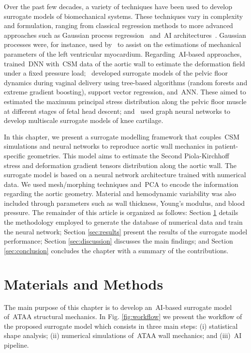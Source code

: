 \documentclass[a4paper,fleqn]{cas-sc}
\begin{document}
Over the past few decades, a variety of techniques have been used to develop surrogate models of biomechanical systems. These techniques vary in complexity and formulation, ranging from classical regression methods to more advanced approaches such as Gaussian process regression~\cite{Su2017_ji,Saida2023_vm} and~\gls{AI} architectures~\cite{Hashemi2023,Moura2024_vy}. Gaussian processes were, for instance, used by~\citet{Di_Achille2018_pn} to assist on the estimations of mechanical parameters of the left ventricular myocardium. Regarding~\gls{AI}-based approaches,~\citet{Liang2023_on} trained~\gls{DNN} with~\gls{CSM} data of the aortic wall to estimate the deformation field under a fixed pressure load;~\citet{Moura2024_rh} developed surrogate models of the pelvic floor dynamics during vaginal delivery using tree-based algorithms (random forests and extreme gradient boosting), support vector regression, and~\gls{ANN}. These aimed to estimated the maximum principal stress distribution along the pelvic floor muscle at different stages of fetal head descent; and~\citet{Sajjadinia2024_dv} used graph neural networks to develop multiscale surrogate models of knee cartilage.

In this chapter, we present a surrogate modelling framework that couples~\gls{CSM} simulations and neural networks to reproduce aortic wall mechanics in patient-specific geometries. This model aims to estimate the Second Piola-Kirchhoff stress and deformation gradient tensors distribution along the aortic wall. The surrogate model is based on a neural network architecture trained with numerical data. We used mesh/morphing techniques and~\gls{PCA} to encode the information regarding the aortic geometry. Material and hemodynamic variability was also included through parameters such as wall thickness, Young's modulus, and blood pressure. The remainder of this article is organized as follows: Section \ref{sec:methods} details the methodology employed to generate the database of numerical data and train the neural network; Section \ref{sec:results} present the results of the surrogate model performance; Section \ref{sec:discussion} discusses the main findings; and Section \ref{sec:conclusion} concludes the chapter with a summary of the contributions.
  
\section{Materials and Methods} \label{sec:methods}
The main purpose of this chapter is to develop an~\gls{AI}-based surrogate model of~\gls{ATAA} structural mechanics. In Fig. \ref{fig:workflow} we present the workflow of the proposed surrogate model which consists in three main steps: (i) statistical shape analysis; (ii) numerical simulations of~\gls{ATAA} wall mechanics; and (iii)~\gls{AI} pipeline.
\end{document}
